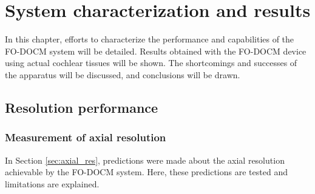 \chapter{System characterization and results}

In this chapter, efforts to characterize the performance and capabilities of the FO-DOCM system will be detailed. Results obtained with the FO-DOCM device using actual cochlear tissues will be shown. The shortcomings and successes of the apparatus will be discussed, and conclusions will be drawn.

\section{Resolution performance}

\subsection{Measurement of axial resolution}

In Section \ref{sec:axial_res}, predictions were made about the axial resolution achievable by the FO-DOCM system. Here, these predictions are tested and limitations are explained.





